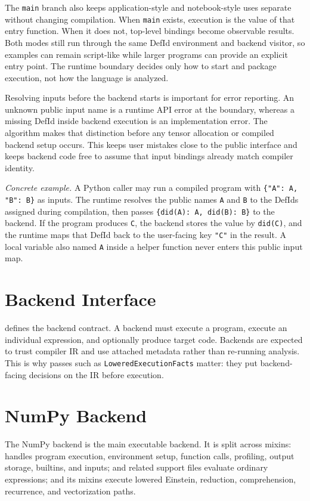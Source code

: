 The \texttt{main} branch also keeps application-style and notebook-style uses
separate without changing compilation. When \texttt{main} exists, execution is
the value of that entry function. When it does not, top-level bindings become
observable results. Both modes still run through the same DefId environment and
backend visitor, so examples can remain script-like while larger programs can
provide an explicit entry point. The runtime boundary decides only how to start
and package execution, not how the language is analyzed.

Resolving inputs before the backend starts is important for error reporting.
An unknown public input name is a runtime API error at the boundary, whereas a
missing DefId inside backend execution is an implementation error. The
algorithm makes that distinction before any tensor allocation or compiled
backend setup occurs. This keeps user mistakes close to the public interface and
keeps backend code free to assume that input bindings already match compiler
identity.

\textit{Concrete example.} A Python caller may run a compiled program with
\texttt{\{"A": A, "B": B\}} as inputs. The runtime resolves the public names
\texttt{A} and \texttt{B} to the DefIds assigned during compilation, then passes
\texttt{\{did(A): A, did(B): B\}} to the backend. If the program produces
\texttt{C}, the backend stores the value by \texttt{did(C)}, and the runtime
maps that DefId back to the user-facing key \texttt{"C"} in the result. A
local variable also named \texttt{A} inside a helper function never enters this
public input map.

\section{Backend Interface}

 defines the backend contract. A backend
must execute a program, execute an individual expression, and optionally produce
target code. Backends are expected to trust compiler IR and use attached
metadata rather than re-running analysis. This is why passes such as
\texttt{LoweredExecutionFacts} matter: they put backend-facing decisions on the
IR before execution.

\section{NumPy Backend}

The NumPy backend is the main executable backend. It is split across mixins:
 handles program execution, environment setup, function
calls, profiling, output storage, builtins, and inputs;
 and related support files evaluate ordinary
expressions;  and its mixins execute lowered
Einstein, reduction, comprehension, recurrence, and vectorization paths.

